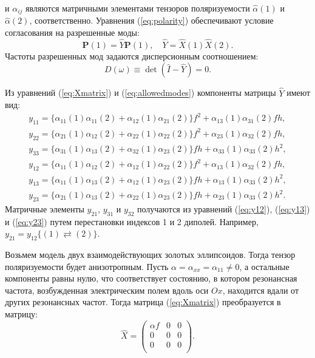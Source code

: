 и $ \alpha _{ij} $ являются матричными элементами тензоров поляризуемости $ \widehat{\alpha}(1) $ и $ \widehat{\alpha}(2) $, соответственно. Уравнения (\ref{eq:polarity}) обеспечивают условие согласования на разрешенные моды:
\begin{equation}
\textbf{P}(1) = \widehat{Y} \textbf{P}(1), \quad
\widehat{Y} = \widehat{X}(1) \widehat{X}(2).
\label{eq:allowedmodes}
\end{equation}
Частоты разрешенных мод задаются дисперсионным соотношением:
\begin{equation}
D(\omega) \equiv \det (\widehat{I} - \widehat{Y}) = 0.
\label{eq:dispersiondipole}
\end{equation}

Из уравнений (\ref{eq:Xmatrix}) и (\ref{eq:allowedmodes}) компоненты матрицы $ \widehat{Y} $ имеют вид:
\begin{subequations}
\begin{gather}
y_{11} = \{\alpha_{11}(1) \alpha_{11}(2) + \alpha_{12}(1) \alpha_{21}(2)  \} f^2 + \alpha_{13}(1) \alpha_{31}(2) fh , \label{eq:y11} \\
y_{22} = \{\alpha_{21}(1) \alpha_{12}(2) + \alpha_{22}(1) \alpha_{22}(2)  \} f^2 + \alpha_{23}(1) \alpha_{32}(2) fh , \label{eq:y22} \\
y_{33} = \{\alpha_{31}(1) \alpha_{13}(2) + \alpha_{32}(1) \alpha_{23}(2)  \} fh + \alpha_{33}(1) \alpha_{33}(2) h^2 , \label{eq:y33} \\
y_{12} = \{\alpha_{11}(1) \alpha_{12}(2) + \alpha_{12}(1) \alpha_{22}(2)  \} f^2 + \alpha_{13}(1) \alpha_{32}(2) fh , \label{eq:y12} \\
y_{13} = \{\alpha_{11}(1) \alpha_{13}(2) + \alpha_{12}(1) \alpha_{23}(2)  \} fh + \alpha_{13}(1) \alpha_{33}(2) h^2 , \label{eq:y13} \\
y_{23} = \{\alpha_{21}(1) \alpha_{13}(2) + \alpha_{22}(1) \alpha_{23}(2)  \} fh + \alpha_{23}(1) \alpha_{33}(2) h^2 . \label{eq:y23}
\end{gather}
\end{subequations}
Матричные элементы $ y_{21} $, $ y_{31} $ и $ y_{32} $ получаются из уравнений (\ref{eq:y12}), (\ref{eq:y13}) и (\ref{eq:y23}) путем перестановки индексов 1 и 2 диполей. Например, $ y_{21} = y_{12} \{ (1) \rightleftarrows (2) \} $. 

Возьмем модель двух взаимодействующих золотых эллипсоидов. Тогда тензор поляризуемости будет анизотропным. Пусть $ \alpha = \alpha_{xx} = \alpha_{11} \neq 0 $, а остальные компоненты равны нулю, что соответствует состоянию, в котором резонансная частота, возбужденная электрическим полем вдоль оси $ Ox $, находится вдали от других резонансных частот. Тогда матрица (\ref{eq:Xmatrix}) преобразуется в матрицу:
\begin{equation}
\widehat{X} = \left(
\begin{matrix}
\alpha f & 0 & 0 \\
0 & 0 & 0 \\
0 & 0 & 0 \\
\end{matrix}
\right).
\label{eq:Xmatrix_dipole}
\end{equation}


